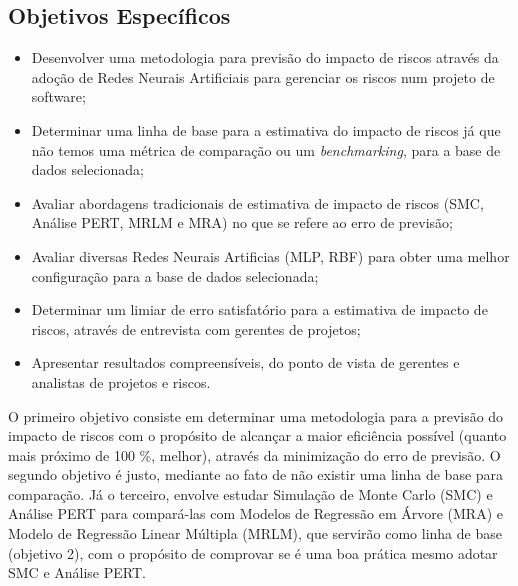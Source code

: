 \subsection{Objetivos Específicos}

\begin{itemize}
\item Desenvolver uma metodologia para previsão do impacto de riscos através da adoção de Redes Neurais Artificiais para gerenciar os riscos num projeto de software;
\item Determinar uma linha de base para a estimativa do impacto de riscos já que não temos uma métrica de comparação ou um \textit{benchmarking}, para a base de dados selecionada;
\item Avaliar abordagens tradicionais de estimativa de impacto de riscos (SMC, Análise PERT, MRLM e MRA) no que se refere ao erro de previsão;
\item Avaliar diversas Redes Neurais Artificias (MLP, RBF) para obter uma melhor configuração para a base de dados selecionada;
\item Determinar um limiar de erro satisfatório para a estimativa de impacto de riscos, através de entrevista com gerentes de projetos;
\item Apresentar resultados compreensíveis, do ponto de vista de gerentes e analistas de projetos e riscos.
\end{itemize}

O primeiro objetivo consiste em determinar uma metodologia para a previsão do impacto de riscos com o propósito de alcançar a maior eficiência possível (quanto mais próximo de 100 \%, melhor), através da minimização do erro de previsão. O segundo objetivo é justo, mediante ao fato de não existir uma linha de base para comparação. Já o terceiro, envolve estudar Simulação de Monte Carlo (SMC) e Análise PERT para compará-las com Modelos de Regressão em Árvore (MRA) e Modelo de Regressão Linear Múltipla (MRLM), que servirão como linha de base (objetivo 2), com o propósito de comprovar se é uma boa prática mesmo adotar SMC e Análise PERT. 

